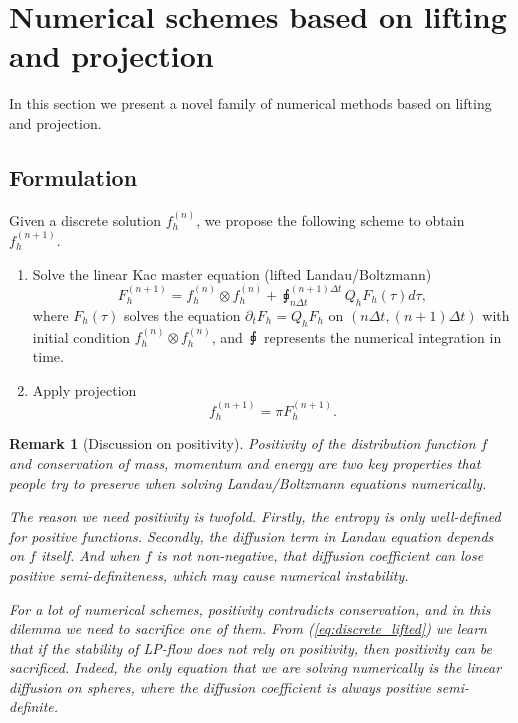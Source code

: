 \documentclass{article}
\newtheorem{remark}{Remark}
\numberwithin{equation}{section}
\begin{document}
\section{Numerical schemes based on lifting and projection}\label{sec:scheme}

In this section we present a novel family of numerical methods based on lifting and projection.

\subsection{Formulation}




Given a discrete solution $f_{h}^{(n)}$, we propose the following scheme to obtain $f^{(n+1)}_{h}$.

\begin{enumerate}
    \item Solve the linear Kac master equation (lifted Landau/Boltzmann)
    \begin{equation}\label{eq:discrete_lifted}
    F^{(n+1)}_{h} = f^{(n)}_{h}\otimes f^{(n)}_{h} + \sqint_{n\Delta t}^{(n+1)\Delta t } Q_{h}F_{h}(\tau) d\tau,
    \end{equation}
    where $F_{h}(\tau)$ solves the equation $\partial_{t} F_{h} = Q_{h} F_{h}$ on $(n \Delta t, (n+1)\Delta t)$ with initial condition $f^{(n)}_{h}\otimes f^{(n)}_{h}$, and $\sqint$ represents the numerical integration in time.
    \item Apply projection
    \begin{equation*}
        f^{(n+1)}_{h} =\pi F^{(n+1)}_{h}.
    \end{equation*}
\end{enumerate}

\begin{remark}[Discussion on positivity]
    Positivity of the distribution function $f$ and conservation of mass, momentum and energy are two key properties that people try to preserve when solving Landau/Boltzmann equations numerically.

The reason we need positivity is twofold. Firstly, the entropy is only well-defined for positive functions. Secondly, the diffusion term in Landau equation depends on $f$ itself. And when $f$ is not non-negative, that diffusion coefficient can lose positive semi-definiteness, which may cause numerical instability.

For a lot of numerical schemes, positivity contradicts conservation, and in this dilemma we need to sacrifice one of them. From (\ref{eq:discrete_lifted}) we learn that if the stability of LP-flow does not rely on positivity, then positivity can be sacrificed. Indeed, the only equation that we are solving numerically is the linear diffusion on spheres, where the diffusion coefficient is always positive semi-definite. 
\end{remark}
\end{document}
